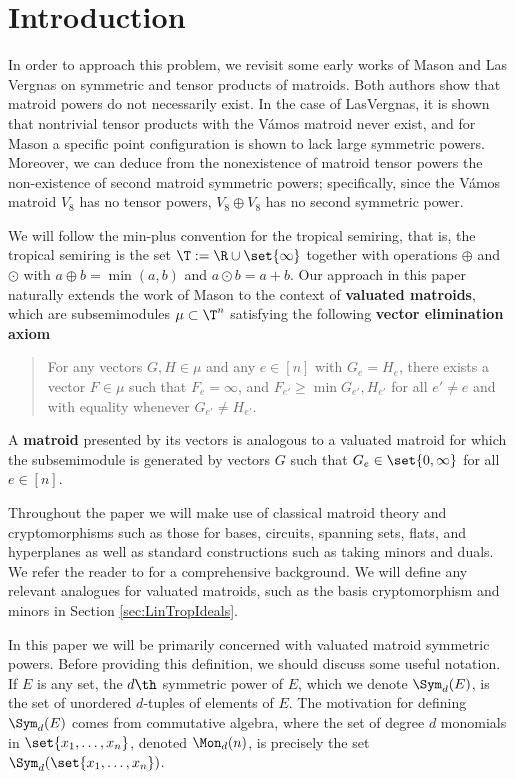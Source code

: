 \section{Introduction}\label{sec:intro}


In order to approach this problem, we revisit some early works of Mason \cite{MGlueing} and Las Vergnas \cite{LV81} on symmetric and tensor products of matroids. Both authors show that matroid powers do not necessarily exist. In the case of LasVergnas, it is shown that nontrivial tensor products with the V\'amos matroid never exist, and for Mason a specific point configuration is shown to lack large symmetric powers. Moreover, we can deduce from the nonexistence of matroid tensor powers the non-existence of second matroid symmetric powers; specifically, since the V\'amos matroid $V_8$ has no tensor powers, $V_8\oplus V_8$ has no second symmetric power.

We will follow the min-plus convention for the tropical semiring, that is, the tropical semiring is the set $\T:= \R\cup \set{\infty}$ together with operations $\oplus$ and $\odot$ with $a\oplus b= \min(a,b)$ and $a\odot b = a+b$. Our approach in this paper naturally extends the work of Mason to the context of \textbf{valuated matroids}, which are subsemimodules $\mu\subset \T^n$ satisfying the following \textbf{vector elimination axiom}
    \begin{quote}
        For any vectors $G,H\in \mu$ and any $e\in [n]$ with $G_e=H_e$, there exists a vector $F\in \mu$ such that $F_e=\infty$, and $F_{e'}\geq\min{G_{e'},H_{e'}}$ for all $e'\neq e$ and with equality whenever $G_{e'}\neq H_{e'}$.
    \end{quote}
A \textbf{matroid} presented by its vectors is analogous to a valuated matroid for which the subsemimodule is generated by vectors $G$ such that $G_e\in \set{0,\infty}$ for all $e\in [n]$.

Throughout the paper we will make use of classical matroid theory and cryptomorphisms such as those for bases, circuits, spanning sets, flats, and hyperplanes as well as standard constructions such as taking minors and duals. We refer the reader to \cite{Oxley06} for a comprehensive background. We will define any relevant analogues for valuated matroids, such as the basis cryptomorphism and minors in Section \ref{sec:LinTropIdeals}.

In this paper we will be primarily concerned with valuated matroid symmetric powers. Before providing this definition, we should discuss some useful notation. If $E$ is any set, the $d\th$ symmetric power of $E$, which we denote $\Sym_d(E)$, is the set of unordered $d$-tuples of elements of $E$. The motivation for defining $\Sym_d(E)$ comes from commutative algebra, where the set of degree $d$ monomials in $\set{x_1,\dots,x_n}$, denoted $\Mon_d(n)$, is precisely the set $\Sym_d(\set{x_1,\dots,x_n})$.

